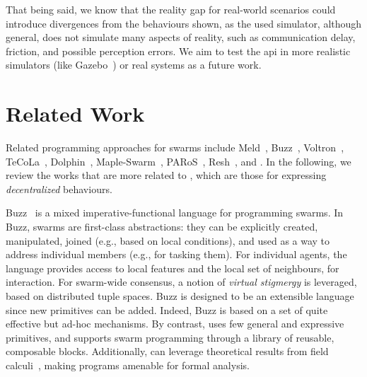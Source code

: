 That being said, 
 we know that the reality gap for real-world scenarios could introduce divergences from the behaviours shown, as the used simulator, although general, 
 does not simulate many aspects of reality, such as communication delay, friction, and possible perception errors. 
%
We aim to test the \ac{api} in more realistic simulators (like Gazebo~\cite{DBLP:conf/iros/KoenigH04}) or real systems as a future work.

\section{Related Work}
\label{coordination2023-macro:sec:rw}

Related programming approaches for swarms 
 include 
 Meld~\cite{Meld2007},
 Buzz~\cite{DBLP:conf/iros/PinciroliB16},
 Voltron~\cite{Mottola2014voltron},
 TeCoLa~\cite{Koutsoubelias2016tecola},
 Dolphin~\cite{lima2018dolphin},
 Maple-Swarm~\cite{DBLP:conf/isola/KosakHBWHR20}, 
 PARoS~\cite{paros},
 Resh~\cite{DBLP:conf/icra/CarrollNS21}, 
 and \cite{DBLP:conf/iros/YiDLD0WY20}.
%
%
In the following, we review the works that are more related to \MacroSwarm{},
 which are those for expressing \emph{decentralized} behaviours.
 

Buzz~\cite{DBLP:conf/iros/PinciroliB16}
 is a mixed imperative-functional language for programming swarms.
%
%
In Buzz, swarms are first-class abstractions:
 they can be explicitly created,
 manipulated,
 joined (e.g., based on local conditions),
 and used as a way to address individual members (e.g., for tasking them). %
%
For individual agents, 
 the language provides access to local features
 and the local set of neighbours, for interaction.
%
For swarm-wide consensus, 
 a notion of \emph{virtual stigmergy} is leveraged,
 based on distributed tuple spaces.
%
Buzz is designed to be an extensible language since new primitives can be added.
%
Indeed, Buzz is based on a set of quite effective but ad-hoc mechanisms.
%
By contrast, \MacroSwarm{} uses few general and expressive primitives, 
  and supports swarm programming
  through a library of reusable, composable blocks.
%
%
Additionally, \MacroSwarm{} can leverage theoretical results from field calculi~\cite{DBLP:journals/jlap/ViroliBDACP19,DBLP:journals/tomacs/ViroliABDP18}, making programs amenable for formal analysis.


